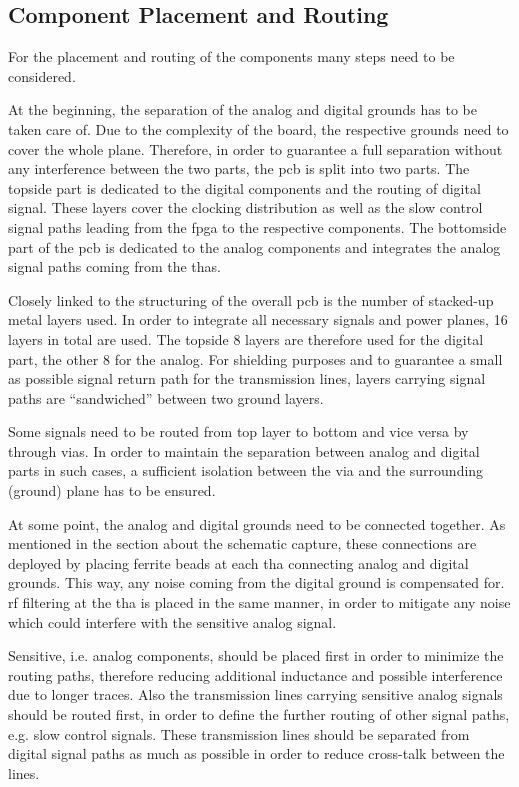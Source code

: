 \subsection{Component Placement and Routing}
For the placement and routing of the components many steps need to be considered.

At the beginning, the separation of the analog and digital grounds has to be taken care of. 
Due to the complexity of the board, the respective grounds need to cover the whole plane. 
Therefore, in order to guarantee a full separation without any interference between the two parts, the \gls{pcb} is split into two parts.
The topside part is dedicated to the digital components and the routing of digital signal. 
These layers cover the clocking distribution as well as the slow control signal paths leading from the \gls{fpga} to the respective components.
The bottomside part of the \gls{pcb} is dedicated to the analog components and integrates the analog signal paths coming from the \glspl{tha}.

Closely linked to the structuring of the overall \gls{pcb} is the number of stacked-up metal layers used.
In order to integrate all necessary signals and power planes, 16 layers in total are used.
The topside 8 layers are therefore used for the digital part, the other 8 for the analog.
For shielding purposes and to guarantee a small as possible signal return path for the transmission lines, layers carrying signal paths are ``sandwiched'' between two ground layers.

Some signals need to be routed from top layer to bottom and vice versa by through vias. 
In order to maintain the separation between analog and digital parts in such cases, a sufficient isolation between the via and the surrounding (ground) plane has to be ensured.

At some point, the analog and digital grounds need to be connected together. 
As mentioned in the section about the schematic capture, these connections are deployed by placing ferrite beads at each \gls{tha} connecting analog and digital grounds.
This way, any noise coming from the digital ground is compensated for. 
\gls{rf} filtering at the \gls{tha} is placed in the same manner, in order to mitigate any noise which could interfere with the sensitive analog signal.

Sensitive, i.e. analog components, should be placed first in order to minimize the routing paths, therefore reducing additional inductance and possible interference due to longer traces.
Also the transmission lines carrying sensitive analog signals should be routed first, in order to define the further routing of other signal paths, e.g. slow control signals. 
These transmission lines should be separated from digital signal paths as much as possible in order to reduce cross-talk between the lines. 

